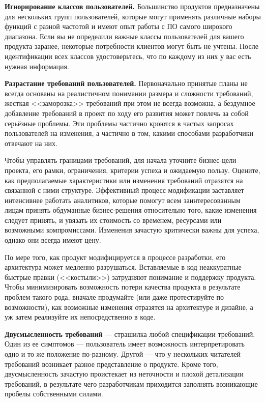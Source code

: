 \documentclass{../../text-style}
\begin{document}
\textbf{Игнорирование классов пользователей.} Большинство продуктов предназначены для нескольких групп пользователей, которые могут применять различные наборы функций с разной частотой и имеют опыт работы с ПО самого широкого диапазона. Если вы не определили важные классы пользователей для вашего продукта заранее, некоторые потребности клиентов могут быть не учтены. После идентификации всех классов удостоверьтесь, что по каждому из них у вас есть нужная информация.

\textbf{Разрастание требований пользователей.} Первоначально принятые планы не всегда основаны на реалистичном понимании размера и сложности требований, жесткая <<заморозка>> требований при этом не всегда возможна, а бездумное добавление требований в проект по ходу его развития может повлечь за собой серьёзные проблемы. Эти проблемы частично кроются в частых запросах пользователей на изменения, а частично в том, какими способами разработчики отвечают на них.

Чтобы управлять границами требований, для начала уточните бизнес-цели проекта, его рамки, ограничения, критерии успеха и ожидаемую пользу. Оцените, как предполагаемые характеристики или изменения требований отразятся на связанной с ними структуре. Эффективный процесс модификации заставляет интенсивнее работать аналитиков, которые помогут всем заинтересованным лицам принять обдуманные бизнес-решения относительно того, какие изменения следует принять, и увязать их стоимость со временем, ресурсами или возможными компромиссами. Изменения зачастую критически важны для успеха, однако они всегда имеют цену.

По мере того, как продукт модифицируется в процессе разработки, его архитектура может медленно разрушаться. Вставляемые в код неаккуратные быстрые правки (<<костыли>>) затрудняют понимание и поддержку продукта. Чтобы минимизировать возможность потери качества продукта в результате проблем такого рода, вначале продумайте (или даже протестируйте по возможности), как возможные изменения отразятся на архитектуре и дизайне, а уж затем реализуйте их непосредственно в коде.

\textbf{Двусмысленность требований} --- страшилка любой спецификации требований. Один из ее симптомов --- пользователь имеет возможность интерпретировать одно и то же положение по-разному. Другой --- что у нескольких читателей требований возникает разное представление о продукте. Кроме того, двусмысленность зачастую проистекает из неточности и плохой детализации требований, в результате чего разработчикам приходится заполнять возникающие пробелы собственными силами.
\end{document}
